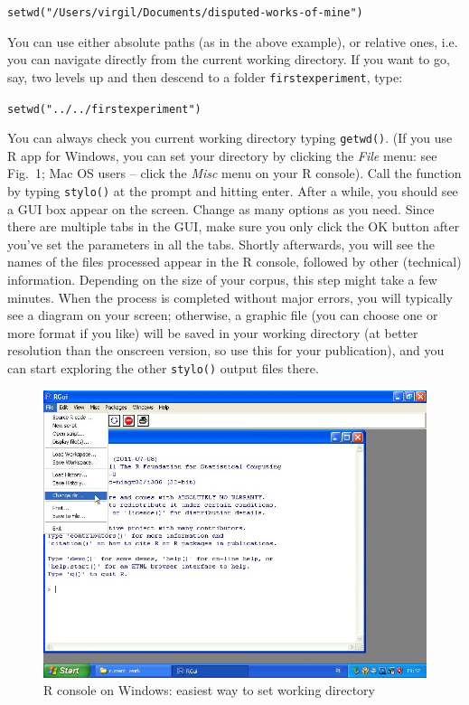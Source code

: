 \documentclass[11pt,a4paper]{article}
\def\underscore{\raisebox{-.8ex}{-}}
\def\code#1{{\tt #1}}
\begin{document}
\medskip{}
\code{setwd("/Users/virgil/Documents/disputed-works-of-mine")}
\medskip{}


\noindent You can use either absolute paths (as in the above example),
or relative ones, i.e. you can navigate directly from the current
working directory. If you want to go, say, two levels up and then
descend to a folder \code{first\underscore experiment},
type:

\medskip{}
\code{setwd("../../first\underscore experiment")}
\medskip{}


You can always check you current working directory typing \code{getwd()}.
(If you use R app for Windows, you can set your directory by clicking
the \emph{File} menu: see Fig.~1; Mac OS users -- click the \emph{Misc}
menu on your R console). Call the function by typing \code{stylo()}
at the prompt and hitting enter. After a while, you should see a GUI
box appear on the screen. Change as many options as you need. Since
there are multiple tabs in the GUI, make sure you only click the OK
button after you've set the parameters in all the tabs. Shortly afterwards,
you will see the names of the files processed appear in the R console,
followed by other (technical) information. Depending on the size of
your corpus, this step might take a few minutes. When the process
is completed without major errors, you will typically see a diagram
on your screen; otherwise, a graphic file (you can choose one or more 
format if you like) will be saved in your working directory (at better resolution than the onscreen version, so use this for your publication), and you can start exploring the other \code{stylo()} output files there.


\begin{figure}
  \centering
  \includegraphics[width=0.65\linewidth]{img/win_setwd.jpg}
  \caption{R console on Windows: easiest way to set working directory}
\end{figure}
\end{document}
